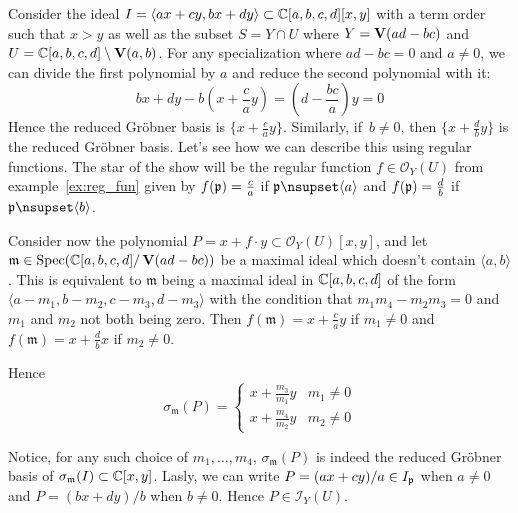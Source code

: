 \begin{example}\upshape
  Consider the ideal $I = \langle ax + cy, bx + dy \rangle \subset \mathbb{C}[a, b, c, d][x, y]$ with a term order such that $x > y$ as well as the subset $S = Y \cap U$ where $Y = \operatorname{\mathbf V}(ad - bc)$ and $U = \mathbb{C}[a, b, c, d] \setminus \operatorname{\mathbf V}(a, b)$. For any specialization where $ad - bc = 0$ and $a \neq 0$, we can divide the first polynomial by $a$ and reduce the second polynomial with it:
  \[bx + dy - b\left(x + \frac c a y\right) = \left(d - \frac{bc}{a}\right)y = 0\]
  Hence the reduced Gröbner basis is $\{x + \frac c a y\}$. Similarly, if $\,b \neq 0$, then $\{x + \frac d b y\}$ is the reduced Gröbner basis. Let's see how we can describe this using regular functions. The star of the show will be the regular function $f \in \mathcal O_{Y}(U)$ from example~\ref{ex:reg_fun} given by $f(\mathfrak p) = \frac c a$ if $\p \nsupset \langle a \rangle$ and $f(\mathfrak p) = \frac d b$ if $\p \nsupset \langle b \rangle$.

  Consider now the polynomial $P = x + f \cdot y \subset \mathcal O_{Y}(U)[x, y]$, and let $\mathfrak m \in \operatorname{Spec}(\mathbb{C}[a, b, c, d]/\operatorname{\mathbf V}(ad - bc))$ be a maximal ideal which doesn't contain $\langle a, b \rangle$. This is equivalent to $\mathfrak m$ being a maximal ideal in $\mathbb{C}[a, b, c, d]$ of the form $\langle a - m_{1}, b - m_{2}, c - m_{3}, d - m_{3} \rangle$ with the condition that $m_{1} m_{4} - m_{2} m_{3} = 0$ and $m_{1}$ and $m_{2}$ not both being zero. Then $f(\mathfrak m) = x + \frac c a y$ if $m_{1} \neq 0$ and $f(\mathfrak m) = x + \frac d b x$ if $m_{2} \neq 0$.

  Hence \[\sigma_{\mathfrak m}(P) =
    \begin{cases}
      x + \frac{m_{3}}{m_{1}}y & m_{1} \neq 0 \\
      x + \frac{m_{4}}{m_{2}}y & m_{2} \neq 0
    \end{cases}
  \]

  Notice, for any such choice of $m_{1}, \dots, m_{4}$, $\sigma_{\mathfrak m}(P)$ is indeed the reduced Gröbner basis of $\sigma_{\mathfrak m}(I) \subset \mathbb{C}[x, y]$. Lasly, we can write $P = (ax + cy)/a \in I_{\mathfrak p}$ when $a \neq 0$ and $P = (bx + dy)/b$ when $b \neq 0$. Hence $P \in \mathcal I_{Y}(U)$.
\end{example}





















